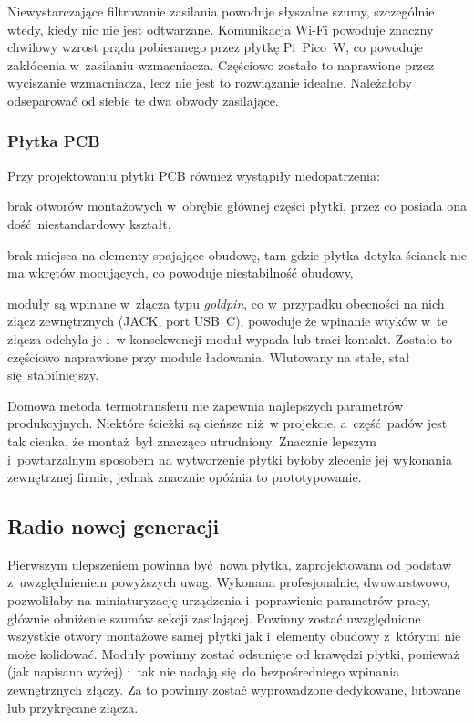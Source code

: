 \documentclass[polish]{aghengthesis}
\let\tempone\itemize
\let\temptwo\enditemize
\renewenvironment{itemize}{\tempone\setlength{\itemsep}{0cm}}{\temptwo}
\begin{document}
				Niewystarczające filtrowanie zasilania powoduje słyszalne szumy, szczególnie wtedy, kiedy nic nie jest odtwarzane. Komunikacja Wi-Fi powoduje znaczny chwilowy wzrost prądu pobieranego przez płytkę Pi~Pico~W, co powoduje zakłócenia w~zasilaniu wzmacniacza. Częściowo zostało to naprawione przez wyciszanie wzmacniacza, lecz nie jest to rozwiązanie idealne. Należałoby odseparować od siebie te dwa obwody zasilające.
				
			\subsubsection{Płytka PCB}
				Przy projektowaniu płytki PCB również wystąpiły niedopatrzenia:
				\begin{itemize}
					\item brak otworów montażowych w~obrębie głównej części płytki, przez co posiada ona dość niestandardowy kształt,
					\item brak miejsca na elementy spajające obudowę, tam gdzie płytka dotyka ścianek nie ma wkrętów mocujących, co powoduje niestabilność obudowy,
					\item moduły są wpinane w~złącza typu \textit{goldpin}, co w~przypadku obecności na nich złącz zewnętrznych (JACK, port USB~C), powoduje że wpinanie wtyków w~te złącza odchyla je i~w konsekwencji moduł wypada lub traci kontakt. Zostało to częściowo naprawione przy module ładowania. Wlutowany na stałe, stał się stabilniejszy.
				\end{itemize}
				
				Domowa metoda termotransferu nie zapewnia najlepszych parametrów produkcyjnych. Niektóre ścieżki są cieńsze niż w projekcie, a~część padów jest tak cienka, że montaż był znacząco utrudniony. Znacznie lepszym i~powtarzalnym sposobem na wytworzenie płytki byłoby zlecenie jej wykonania zewnętrznej firmie, jednak znacznie opóźnia to prototypowanie.
		
		\subsection{Radio nowej generacji}
			Pierwszym ulepszeniem powinna być nowa płytka, zaprojektowana od podstaw z~uwzględnieniem powyższych uwag. Wykonana profesjonalnie, dwuwarstwowo, pozwoliłaby na miniaturyzację urządzenia i~poprawienie parametrów pracy, głównie obniżenie szumów sekcji zasilającej. Powinny zostać uwzględnione wszystkie otwory montażowe samej płytki jak i~elementy obudowy z~którymi nie może kolidować. Moduły powinny zostać odsunięte od krawędzi płytki, ponieważ (jak napisano wyżej) i~tak nie nadają się do bezpośredniego wpinania zewnętrznych złączy. Za to powinny zostać wyprowadzone dedykowane, lutowane lub przykręcane złącza.
			$ $\\
\end{document}
